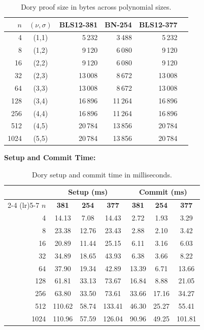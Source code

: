 \begin{table}[H]
\centering
\caption{Dory proof size in bytes across polynomial sizes.}
\label{tab:dory-proof-size}
\begin{tabular}{rcrrrr}
\toprule
$n$ & $(\nu,\sigma)$ & \textbf{BLS12-381} & \textbf{BN-254} & \textbf{BLS12-377} \\
\midrule
4    & (1,1) & 5\,232  & 3\,488  & 5\,232  \\
8    & (1,2) & 9\,120  & 6\,080  & 9\,120  \\
16   & (2,2) & 9\,120  & 6\,080  & 9\,120  \\
32   & (2,3) & 13\,008 & 8\,672  & 13\,008 \\
64   & (3,3) & 13\,008 & 8\,672  & 13\,008 \\
128  & (3,4) & 16\,896 & 11\,264 & 16\,896 \\
256  & (4,4) & 16\,896 & 11\,264 & 16\,896 \\
512  & (4,5) & 20\,784 & 13\,856 & 20\,784 \\
1024 & (5,5) & 20\,784 & 13\,856 & 20\,784 \\
\bottomrule
\end{tabular}
\end{table}

\textbf{Setup and Commit Time:}

\begin{table}[H]
\centering
\caption{Dory setup and commit time in milliseconds.}
\label{tab:dory-setup-commit}
\begin{tabular}{rcccccc}
\toprule
& \multicolumn{3}{c}{\textbf{Setup (ms)}} & \multicolumn{3}{c}{\textbf{Commit (ms)}} \\
\cmidrule(lr){2-4} \cmidrule(lr){5-7}
$n$ & \textbf{381} & \textbf{254} & \textbf{377}
    & \textbf{381} & \textbf{254} & \textbf{377} \\
\midrule
4    & 14.13  & 7.08  & 14.43  & 2.72  & 1.93  & 3.29  \\
8    & 23.38  & 12.76 & 23.43  & 2.88  & 2.10  & 3.42  \\
16   & 20.89  & 11.44 & 25.15  & 6.11  & 3.16  & 6.03  \\
32   & 34.89  & 18.65 & 43.93  & 6.38  & 3.66  & 8.22  \\
64   & 37.90  & 19.34 & 42.89  & 13.39 & 6.71  & 13.66 \\
128  & 61.81  & 33.13 & 73.67  & 16.84 & 8.88  & 21.05 \\
256  & 63.80  & 33.50 & 73.61  & 33.66 & 17.16 & 34.27 \\
512  & 110.62 & 58.74 & 133.41 & 46.30 & 25.27 & 55.41 \\
1024 & 110.96 & 57.59 & 126.04 & 90.96 & 49.25 & 101.81 \\
\bottomrule
\end{tabular}
\end{table}

